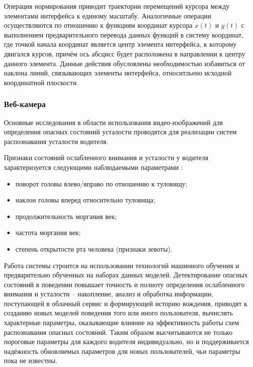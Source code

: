 Операция нормирования приводит траектории перемещений курсора между элементами интерфейса к единому масштабу. Аналогичные операции осуществляются по отношению к функциям координат курсора $x(t)$ и $y(t)$ с выполнением предварительного перевода данных функций в систему координат, где точкой начала координат является центр элемента интерфейса, к которому двигался курсов, причём ось абсцисс будет расположена в направлении к центру данного элемента. Данные действия обусловлены необходимостью избавиться от наклона линий, связывающих элементы интерфейса, относитльено исходной координатной плоскости. \cite{mouseMethod}

\subsubsection{Веб-камера}
Основные исследования в области использования видео-изображений для определения опасных состояний усталости проводятся для реализации систем распознавания усталости водителя.

Признаки состояний ослабленного внимания и усталости у водителя характеризуется следующими наблюдаемыми параметрами \cite{videoMethod}:
\begin{itemize}[leftmargin=1.6\parindent]
\item поворот головы влево/вправо по отношению к туловищу;
\item наклон головы вперед относительно туловища;
\item продолжительность моргания век;
\item частота моргания век;
\item степень открытости рта человека (признаки зевоты).
\end{itemize}

Работа системы строится на использовании технологий машинного обучения и предварительно обученных на наборах данных моделей. Детектирование опасных состояний в поведении повышает точность и полноту определения ослабленного внимания и усталости -- накопление, анализ и обработка информации, поступающей в облачный сервис и формирующей историю вождения, приводят к созданию новых моделей поведения того или иного пользователя, вычислять характерные параметры, оказывающие влияние на эффективность работы схем распознавания опасных состояний. Таким образом высчитываются не только пороговые параметры для каждого водителя индивидуально, но и поддерживается надёжность обновляемых параметров для новых пользователей, чьи параметры пока не известны. \cite{videoMethod}

